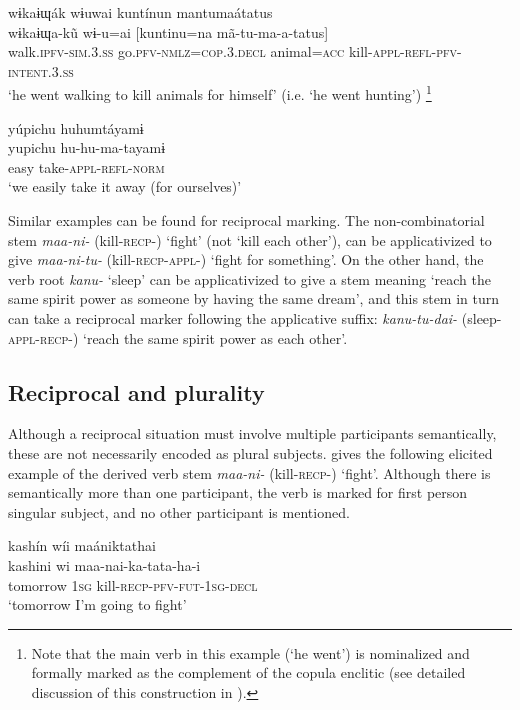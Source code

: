 \documentclass[output=paper]{langscibook}
\begin{document}
\ea%
    \label{ex:overall:18}
    \glll wɨkaɨɰák wɨuwai kuntínun mantumaátatus\\
  wɨkaɨɰa-k\~u  wɨ-u=ai  [kuntinu=na mã-tu-ma-a-tatus]\\
  walk\textsc{.ipfv-sim.3.ss}  go\textsc{.pfv-nmlz=cop.3.decl}  animal\textsc{=acc} kill\textsc{{}-appl-refl-pfv-intent.3.ss}\\
  \glt  ‘he went walking to kill animals for himself’ (i.e. ‘he went hunting’) \citep[492]{Overall2017}\footnote{Note that the main verb in this example (‘he went’) is nominalized and formally marked as the complement of the copula enclitic (see detailed discussion of this construction in \citealt{Overall2018}).}
\z

\ea%
    \label{ex:overall:19}
    \glll yúpichu huhumtáyamɨ\\
  yupichu  hu-hu-ma-tayamɨ\\
  easy  take-\textsc{appl-refl-norm}\\
  \glt  ‘we easily take it away (for ourselves)’ \citep[617]{Overall2017}
\z

Similar examples can be found for reciprocal marking. The non-combinatorial stem \textit{maa-ni-} (kill-\textsc{recp-}) ‘fight’ (not ‘kill each other’), can be applicativized to give \textit{maa-ni-tu-} (kill-\textsc{recp-appl-}) ‘fight for something’. On the other hand, the verb root \textit{kanu-} ‘sleep’ can be applicativized to give a stem meaning ‘reach the same spirit power as someone by having the same dream’, and this stem in turn can take a reciprocal marker following the applicative suffix: \textit{kanu-tu-dai-} (sleep-\textsc{appl-recp-}) ‘reach the same spirit power as each other’.

\subsection{Reciprocal and plurality} %
\label{sec:overall:3.2}

Although a reciprocal situation must involve multiple participants semantically, these are not necessarily encoded as plural subjects. \citet{Overall2017} gives the following elicited example  of the derived verb stem \textit{maa-ni-} (kill-\textsc{recp-}) ‘fight’. Although there is semantically more than one participant, the verb is marked for first person singular subject, and no other participant is mentioned.

\ea%
    \label{ex:overall:20}
    \glll kashín wíi maániktathai\\
  kashini  wi  maa-nai-ka-tata-ha-i\\
  tomorrow  1\textsc{sg}  kill-\textsc{recp-pfv-fut-1sg-decl}\\
  \glt  ‘tomorrow I’m going to fight’ \citep[311]{Overall2017}
\z
\end{document}
